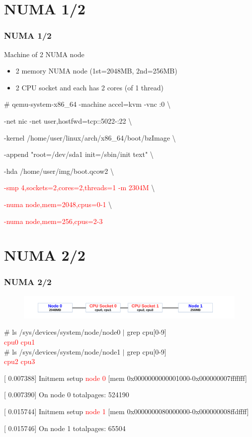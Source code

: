 \documentclass[aspectratio=169]{beamer}
\begin{document}
\section{NUMA 1/2}
\begin{frame}
\frametitle{NUMA 1/2}
{\LARGE Machine of 2 NUMA node}
\begin{itemize}
\item {\large 2 memory NUMA node (1st=2048MB, 2nd=256MB)}
\item {\large 2 CPU socket and each has 2 cores (of 1 thread)}
\end{itemize}
\begin{block}{}

\# qemu-system-x86\_64 -machine accel=kvm -vnc :0 \textbackslash

-net nic -net user,hostfwd=tcp::5022-:22 \textbackslash

-kernel /home/user/linux/arch/x86\_64/boot/bzImage \textbackslash
	
-append "root=/dev/sda1 init=/sbin/init text" \textbackslash

-hda /home/user/img/boot.qcow2 \textbackslash

\textcolor{red}{-smp 4,sockets=2,cores=2,threads=1 -m 2304M} \textbackslash

\textcolor{red}{-numa node,mem=2048,cpus=0-1} \textbackslash

\textcolor{red}{-numa node,mem=256,cpus=2-3}

\end{block}
\end{frame}


\section{NUMA 2/2}
\begin{frame}
\frametitle{NUMA 2/2}
\begin{figure}
\includegraphics[width=1.0\linewidth]{figures/numa.pdf}
\end{figure}
\begin{block}{}
\# ls /sys/devices/system/node/node0 $|$ grep cpu[0-9] \\
\textcolor{red}{cpu0 cpu1} \\
\# ls /sys/devices/system/node/node1 $|$ grep cpu[0-9] \\
\textcolor{red}{cpu2 cpu3}
\end{block}
\begin{block}{}
[    0.007388] Initmem setup \textcolor{red}{node 0} [mem 0x0000000000001000-0x000000007fffffff]

[    0.007390] On node 0 totalpages: 524190

[    0.015744] Initmem setup \textcolor{red}{node 1} [mem 0x0000000080000000-0x000000008ffdffff]

[    0.015746] On node 1 totalpages: 65504
\end{block}
\end{frame}
\end{document}
